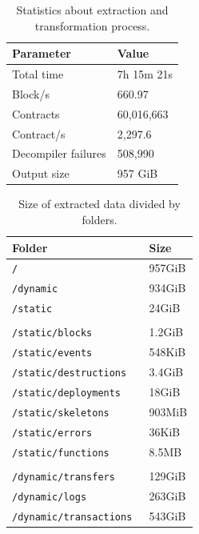 \begin{table}[H]
\centering
    \begin{threeparttable}
    \begin{tabular}{ m{5cm} m{3cm} } 
    \toprule
    \textbf{Parameter} & \textbf{Value}\\
    \midrule
    Total time   & 7h 15m 21s   \\ [1.2ex]
    Block/s      & 660.97       \\ [1.2ex]
    Contracts    & 60,016,663   \\ [1.2ex]
    Contract/s   & 2,297.6       \\ [1.2ex]
    Decompiler failures & 508,990 \\ [1.2ex]
    Output size  & 957 GiB        \\ [1.2ex]
    \bottomrule
    \end{tabular}
    \end{threeparttable}
    \caption{Statistics about extraction and transformation process.}
    \label{table:extraction-stats}
\end{table}

\begin{table}[H]
\centering
    \begin{threeparttable}
    \begin{tabular}{ m{5cm} m{3cm} } 
    \toprule
    \textbf{Folder} & \textbf{Size}\\
    \midrule
    {\tt / } & 957GiB \\
    {\tt /dynamic }    & 934GiB \\
    {\tt /static }     & 24GiB  \\
    & \\
    {\tt /static/blocks } & 1.2GiB  \\
    {\tt /static/events } & 548KiB    \\
    {\tt /static/destructions } & 3.4GiB    \\
    {\tt /static/deployments } & 18GiB  \\    
    {\tt /static/skeletons } & 903MiB    \\
    {\tt /static/errors } & 36KiB     \\
    {\tt /static/functions } & 8.5MB  \\  
    & \\
    {\tt /dynamic/transfers } & 129GiB    \\
    {\tt /dynamic/logs } & 263GiB    \\
    {\tt /dynamic/transactions } & 543GiB    \\
    \bottomrule
    \end{tabular}
    \end{threeparttable}
    \caption{Size of extracted data divided by folders.}
    \label{table:extraction-output}
\end{table}

